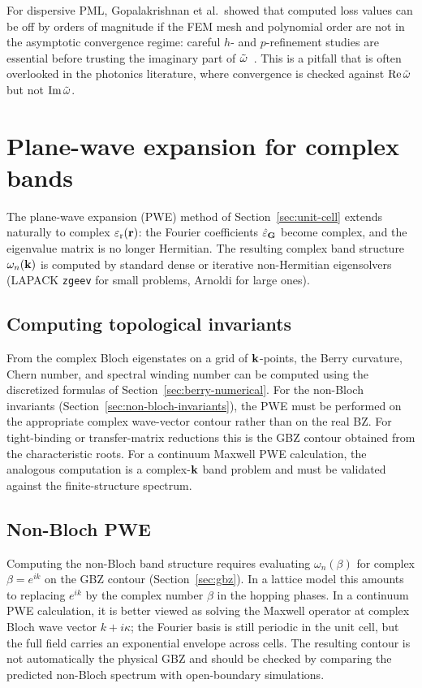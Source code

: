 For dispersive PML, Gopalakrishnan et al.\ showed that computed loss
values can be off by orders of magnitude if the FEM mesh and polynomial
order are not in the asymptotic convergence regime: careful $h$- and
$p$-refinement studies are essential before trusting the imaginary part
of $\tilde{\omega}$~\cite{jgopalakrishnan2022computing}. This is a pitfall
that is often overlooked in the photonics literature, where convergence
is checked against $\operatorname{Re}\tilde{\omega}$ but not $\operatorname{Im}\tilde{\omega}$.


\section{Plane-wave expansion for complex bands}
\label{sec:pwe-complex}

The plane-wave expansion (PWE) method of Section~\ref{sec:unit-cell}
extends naturally to complex $\varepsilon_{\mathrm{r}}(\mathbf{r})$: the Fourier
coefficients $\hat{\varepsilon}_{\mathbf{G}}$ become complex, and the eigenvalue
matrix is no longer Hermitian. The resulting complex band structure
$\omega_n(\mathbf{k})$ is computed by standard dense or iterative non-Hermitian
eigensolvers (LAPACK \texttt{zgeev} for small problems, Arnoldi for
large ones).

\subsection{Computing topological invariants}
\label{ssec:pwe-topology}

From the complex Bloch eigenstates on a grid of $\mathbf{k}$-points, the
Berry curvature, Chern number, and spectral winding number can be
computed using the discretized formulas of
Section~\ref{sec:berry-numerical}. For the non-Bloch invariants
(Section~\ref{sec:non-bloch-invariants}), the PWE must be performed on
the appropriate complex wave-vector contour rather than on the real BZ.
For tight-binding or transfer-matrix reductions this is the GBZ contour
obtained from the characteristic roots. For a continuum Maxwell PWE
calculation, the analogous computation is a complex-$\mathbf{k}$ band problem
and must be validated against the finite-structure spectrum.

\subsection{Non-Bloch PWE}
\label{ssec:non-bloch-pwe}

Computing the non-Bloch band structure requires evaluating
$\omega_n(\beta)$ for complex $\beta = e^{ik}$ on the GBZ contour
(Section~\ref{sec:gbz}). In a lattice model this amounts to replacing
$e^{ik}$ by the complex number $\beta$ in the hopping phases. In a
continuum PWE calculation, it is better viewed as solving the Maxwell
operator at complex Bloch wave vector $k+i\kappa$; the Fourier basis is
still periodic in the unit cell, but the full field carries an
exponential envelope across cells. The resulting contour is not
automatically the physical GBZ and should be checked by comparing the
predicted non-Bloch spectrum with open-boundary simulations.



